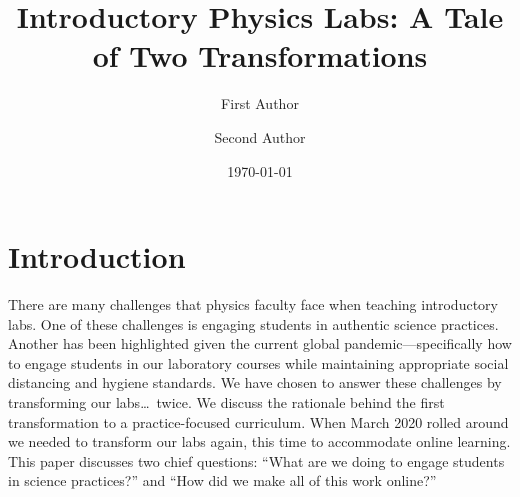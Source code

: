 \documentclass[aip, numerical, preprint]{revtex4-2}
\begin{document}
\title{Introductory Physics Labs: A Tale of Two Transformations}


\author{First Author} 

\author{Second Author} 

\date{\today}


\maketitle

\section{Introduction}
There are many challenges that physics faculty face when teaching introductory labs. One of
these challenges is engaging students in authentic science practices.  Another has been
highlighted given the current global pandemic---specifically how to engage students in our
laboratory courses while maintaining appropriate social distancing and hygiene standards. We
have chosen to answer these challenges by transforming our labs\ldots\ twice. We discuss the
rationale behind the first transformation to a practice-focused curriculum.  When March 2020
rolled around we needed to transform our labs again, this time to accommodate online
learning. This paper discusses two chief questions: ``What are we doing to engage students in
science practices?'' and ``How did we make all of this work online?''
\end{document}
